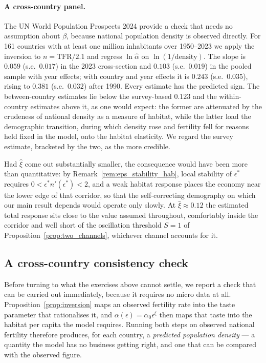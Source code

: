 \documentclass[11pt]{article}
\begin{document}
\paragraph{A cross-country panel.}
The UN World Population Prospects 2024 provide a check that needs no assumption about $\beta$,
because national population density is observed directly. For 161 countries with at least one
million inhabitants over 1950--2023 we apply the inversion to $n=\text{TFR}/2.1$ and regress
$\ln\hat\alpha$ on $\ln(1/\text{density})$. The slope is $0.059$ (s.e.\ $0.017$) in the 2023
cross-section and $0.103$ (s.e.\ $0.019$) in the pooled sample with year effects; with country and
year effects it is $0.243$ (s.e.\ $0.035$), rising to $0.381$ (s.e.\ $0.032$) after 1990. Every
estimate has the predicted sign. The between-country estimates lie below the survey-based
$0.123$ and the within-country estimates above it, as one would expect: the former are attenuated
by the crudeness of national density as a measure of habitat, while the latter load the
demographic transition, during which density rose and fertility fell for reasons held fixed in the
model, onto the habitat elasticity. We regard the survey estimate, bracketed by the two, as the
more credible.

Had $\hat\xi$ come out substantially smaller, the consequence would have been more than
quantitative: by Remark~\ref{rem:eps_stability_hab}, local stability of $\epsilon^{\ast}$ requires
$0<\epsilon^{\ast}n'(\epsilon^{\ast})<2$, and a weak habitat response places the economy near the
lower edge of that corridor, so that the self-correcting demography on which our main result depends
would operate only slowly. At $\hat\xi\approx0.12$ the estimated total response sits close to the value assumed throughout,
comfortably inside the corridor and well short of the oscillation threshold $S=1$ of
Proposition~\ref{prop:two_channels}, whichever channel accounts for it.

\subsection{A cross-country consistency check}
\label{sub:crosscountry}

Before turning to what the exercises above cannot settle, we report a check that can be carried out
immediately, because it requires no micro data at all. Proposition~\ref{prop:inversion} maps an
observed fertility rate into the taste parameter that rationalises it, and
$\alpha(\epsilon)=\alpha_0\epsilon^{\xi}$ then maps that taste into the habitat per capita the model
requires. Running both steps on observed national fertility therefore produces, for each country, a
\emph{predicted population density} --- a quantity the model has no business getting right, and one
that can be compared with the observed figure.
\end{document}
